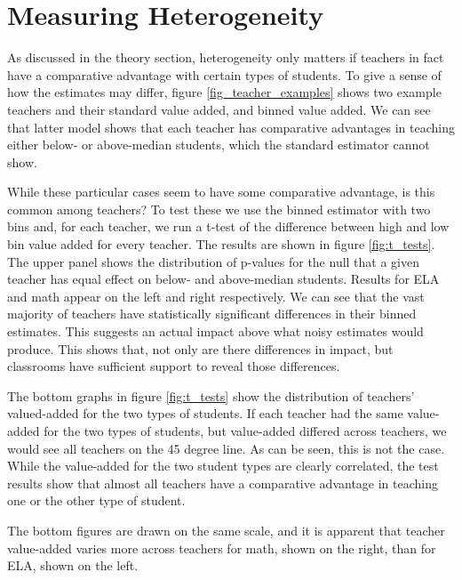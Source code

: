 \documentclass[12pt]{article}
\theoremstyle{definition}
\theoremstyle{definition}
\theoremstyle{definition}
\theoremstyle{definition}
\begin{document}
\section{Measuring Heterogeneity} \label{hetva}

    As discussed in the theory section, heterogeneity only matters if teachers in fact have a comparative advantage with certain types of students. To give a sense of how the estimates may differ, figure \ref{fig_teacher_examples}  shows two example teachers and their standard value added, and binned value added. We can see that latter model shows that each teacher has comparative advantages in teaching either below- or above-median students, which the standard estimator cannot show. 
    
    While these particular cases seem to have some comparative advantage, is this common among teachers? To test these we use the binned estimator with two bins and, for each teacher, we run a t-test of the difference between high and low bin value added for every teacher. The results are shown in figure \ref{fig:t_tests}. The upper panel shows the distribution of p-values for the null that a given teacher has equal effect on below- and above-median students. Results for ELA and math appear on the left and right respectively. We can see that the vast majority of teachers have statistically significant differences in their binned estimates. This suggests an actual impact above what noisy estimates would produce. This shows that, not only are there differences in impact, but classrooms have sufficient support to reveal those differences. 
    
    The bottom graphs in figure \ref{fig:t_tests} show the distribution of teachers' valued-added for the two types of students. If each teacher had the same value-added for the two types of students, but value-added differed across teachers, we would see all teachers on the 45 degree line.  As can be seen, this is not the case. While the value-added for the two student types are clearly correlated, the test results show that almost all teachers have a comparative advantage in teaching one or the other type of student.  

    The bottom figures are drawn on the same scale, and it is apparent that teacher value-added varies more across teachers for math, shown on the right, than for ELA, shown on the left.  
    
\end{document}
